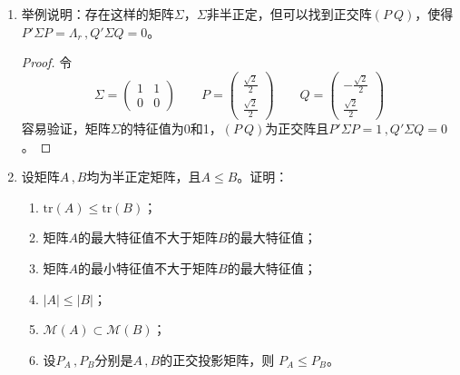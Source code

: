 \documentclass[10pt]{article}
\theoremstyle{definition}
\theoremstyle{definition}
\begin{document}
\begin{enumerate}
\item	%
    举例说明：存在这样的矩阵$\Sigma$，$\Sigma$非半正定，但可以找到正交阵$(P\  Q)$，使得$P'\Sigma P=\Lambda_r\, ,Q'\Sigma Q=0$。 

    \begin{proof}
        令
        \begin{equation*}
            \Sigma=
            \begin{pmatrix}
                1 & 1 \\
                0 & 0
            \end{pmatrix} \qquad P=
            \begin{pmatrix}
                \frac{\sqrt{2}}{2} \\
                \frac{\sqrt{2}}{2}
            \end{pmatrix} \qquad Q=
            \begin{pmatrix}
                -\frac{\sqrt{2}}{2} \\
                \frac{\sqrt{2}}{2}
            \end{pmatrix}
        \end{equation*}
        容易验证，矩阵$\Sigma$的特征值为0和1，$(P\  Q)$为正交阵且$P'\Sigma P=1\, ,Q'\Sigma Q=0$。
    \end{proof}

\item	%
    设矩阵$A\, ,B$均为半正定矩阵，且$A\le B$。证明：

    \begin{enumerate}[label=(\roman*)]
        \item$\mathrm{tr}(A) \le \mathrm{tr}(B)$；
        \item 矩阵$A$的最大特征值不大于矩阵$B$的最大特征值；
        \item 矩阵$A$的最小特征值不大于矩阵$B$的最大特征值；
        \item$|A|\le |B|$；
        \item$\mathcal{M}(A)\subset \mathcal{M}(B)$；
        \item 设$P_A\, , P_B$分别是$A\, ,B$的正交投影矩阵，则
            $P_A \le P_B$。
    \end{enumerate}


\end{enumerate}
\end{document}
